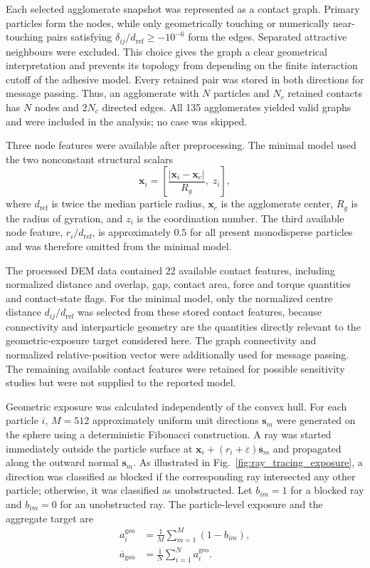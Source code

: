 \documentclass[12pt,a4paper]{article}
\begin{document}
Each selected agglomerate snapshot was represented as a contact graph. Primary particles
form the nodes, while only geometrically touching or numerically near-touching
pairs satisfying $\delta_{ij}/d_{\mathrm{ref}}\geq-10^{-6}$ form the edges.
Separated attractive neighbours were excluded. This choice gives the graph a
clear geometrical interpretation and prevents its topology from depending on
the finite interaction cutoff of the adhesive model. Every retained pair was
stored in both directions for message passing. Thus, an agglomerate with $N$
particles and $N_c$ retained contacts has $N$ nodes and $2N_c$ directed edges.
All 135 agglomerates yielded valid graphs and were included in the analysis;
no case was skipped.

Three node features were available after preprocessing. The minimal model used
the two nonconstant structural scalars
\begin{equation}
 \boldsymbol{x}_i=
 \left[
   \frac{|\boldsymbol{x}_i-\boldsymbol{x}_c|}{R_g},\;
   z_i
 \right],
\end{equation}
where $d_{\mathrm{ref}}$ is twice the median particle radius,
$\boldsymbol{x}_c$ is the agglomerate center, $R_g$ is the radius of gyration,
and $z_i$ is the coordination number. The third available node feature,
$r_i/d_{\mathrm{ref}}$, is approximately $0.5$ for all present monodisperse
particles and was therefore omitted from the minimal model.

The processed DEM data contained 22 available contact features, including
normalized distance and overlap, gap, contact area, force and torque quantities
and contact-state flags. For the minimal model, only the normalized centre
distance $d_{ij}/d_{\mathrm{ref}}$ was selected from these stored contact
features, because connectivity and interparticle geometry are the quantities
directly relevant to the geometric-exposure target considered here. The graph
connectivity and normalized relative-position vector were additionally used
for message passing. The remaining available contact features were retained
for possible sensitivity studies but were not supplied to the reported model.

Geometric exposure was calculated independently of the convex hull. For each
particle $i$, $M=512$ approximately uniform unit directions
$\boldsymbol{s}_m$ were generated on the sphere using a deterministic Fibonacci
construction. A ray was started immediately outside the particle surface at
$\boldsymbol{x}_i+(r_i+\varepsilon)\boldsymbol{s}_m$ and propagated along the
outward normal $\boldsymbol{s}_m$. As illustrated in
Fig.~\ref{fig:ray_tracing_exposure}, a direction was classified as blocked if
the corresponding ray intersected any other particle; otherwise, it was
classified as unobstructed. Let $b_{im}=1$ for a blocked ray and $b_{im}=0$ for
an unobstructed ray. The particle-level exposure and the aggregate target are
\begin{align}
	a_i^{\mathrm{geo}} &= \frac{1}{M}\sum_{m=1}^{M}(1-b_{im}),\\
	\overline{a}_{\mathrm{geo}} &=
	\frac{1}{N}\sum_{i=1}^{N}a_i^{\mathrm{geo}}.
\end{align}
\end{document}
